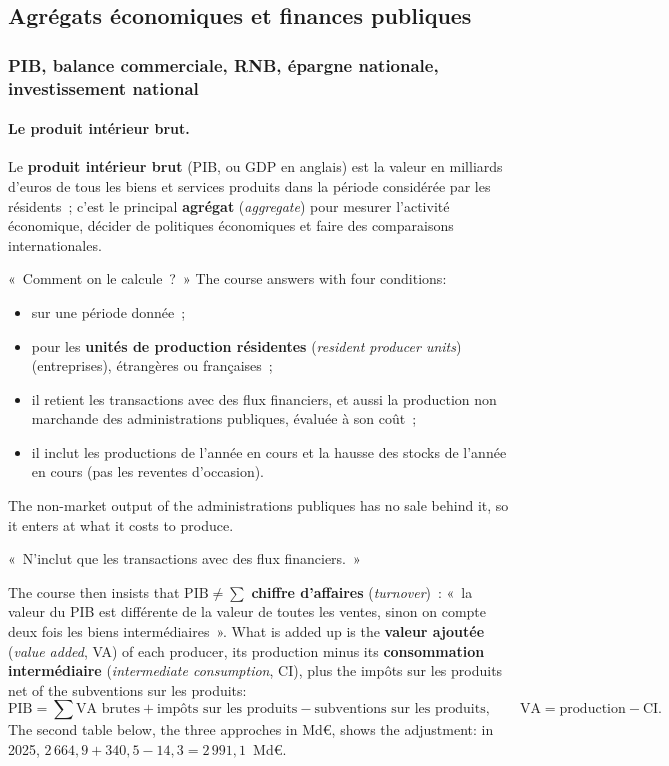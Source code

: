 \subsection{Agrégats économiques et finances publiques}

\subsubsection{PIB, balance commerciale, RNB, épargne nationale, investissement national}

\paragraph{Le produit intérieur brut.}

\begin{definition}
  Le \textbf{produit intérieur brut} (PIB, ou GDP en anglais) est la valeur en
  milliards d'euros de tous les biens et services produits dans la période
  considérée par les résidents~; c'est le principal \textbf{agrégat}
  (\textit{aggregate}) pour mesurer l'activité économique, décider de politiques
  économiques et faire des comparaisons internationales.
\end{definition}

«~Comment on le calcule~?~» The course answers with four conditions:
\begin{itemize}
  \item sur une période donnée~;
  \item pour les \textbf{unités de production résidentes} (\textit{resident
    producer units}) (entreprises), étrangères ou françaises~;
  \item il retient les transactions avec des flux financiers, et aussi la
    production non marchande des administrations publiques, évaluée à son coût~;
  \item il inclut les productions de l'année en cours et la hausse des stocks de
    l'année en cours (pas les reventes d'occasion).
\end{itemize}
The non-market output of the administrations publiques has no sale behind it,
so it enters at what it costs to produce.

\begin{remark}
  «~N'inclut que les transactions avec des flux financiers.~»
\end{remark}

The course then insists that $\text{PIB} \neq \sum$ \textbf{chiffre
d'affaires} (\textit{turnover})~: «~la valeur du PIB est différente de la valeur
de toutes les ventes, sinon on compte deux fois les biens intermédiaires~». What
is added up is the \textbf{valeur ajoutée} (\textit{value added}, VA) of each
producer, its production minus its \textbf{consommation intermédiaire}
(\textit{intermediate consumption}, CI), plus the impôts sur les produits net of the
subventions sur les produits:
\[
  \text{PIB} = \sum \text{VA brutes} + \text{impôts sur les produits}
  - \text{subventions sur les produits},
  \qquad \text{VA} = \text{production} - \text{CI}.
\]
The second table below, the three approches in Md€, shows the adjustment:
in 2025, $2\,664{,}9 + 340{,}5 - 14{,}3 = 2\,991{,}1$~Md€.

